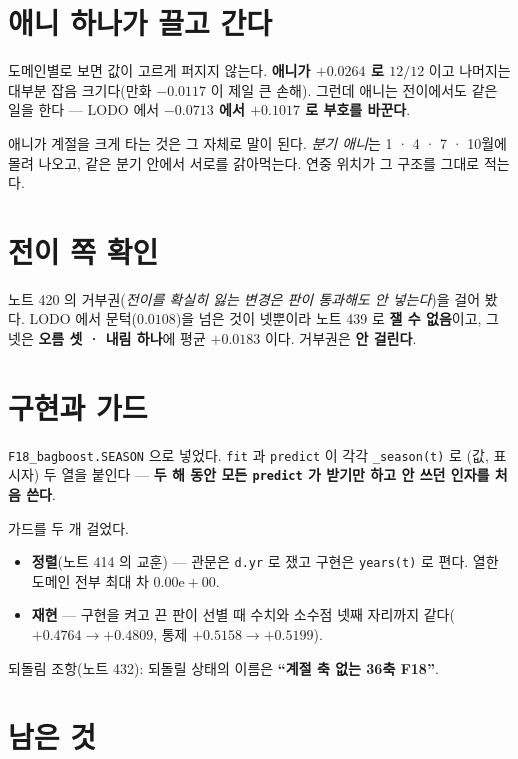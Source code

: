 \documentclass[11pt]{article}
\begin{document}
\section{애니 하나가 끌고 간다}

도메인별로 보면 값이 고르게 퍼지지 않는다. \textbf{애니가 $+0.0264$ 로
$12/12$} 이고 나머지는 대부분 잡음 크기다(만화 $-0.0117$ 이 제일 큰
손해). 그런데 애니는 전이에서도 같은 일을 한다 --- LODO 에서
\textbf{$-0.0713$ 에서 $+0.1017$ 로 부호를 바꾼다}.

애니가 계절을 크게 타는 것은 그 자체로 말이 된다. \emph{분기 애니}는
1 · 4 · 7 · 10월에 몰려 나오고, 같은 분기 안에서 서로를 갉아먹는다.
연중 위치가 그 구조를 그대로 적는다.

\section{전이 쪽 확인}

노트 420 의 거부권(\emph{전이를 확실히 잃는 변경은 판이 통과해도 안
넣는다})을 걸어 봤다. LODO 에서 문턱($0.0108$)을 넘은 것이 넷뿐이라
노트 439 로 \textbf{잴 수 없음}이고, 그 넷은 \textbf{오름 셋 · 내림
하나}에 평균 $+0.0183$ 이다. 거부권은 \textbf{안 걸린다}.

\section{구현과 가드}

\texttt{F18\_bagboost.SEASON} 으로 넣었다. \texttt{fit} 과
\texttt{predict} 이 각각 \texttt{\_season(t)} 로 (값, 표시자) 두 열을
붙인다 --- \textbf{두 해 동안 모든 \texttt{predict} 가 받기만 하고 안
쓰던 인자를 처음 쓴다}.

가드를 두 개 걸었다.

\begin{itemize}
\item \textbf{정렬}(노트 414 의 교훈) --- 관문은 \texttt{d.yr} 로 쟀고
구현은 \texttt{years(t)} 로 편다. 열한 도메인 전부 최대 차
$0.00\mathrm{e}{+}00$.
\item \textbf{재현} --- 구현을 켜고 끈 판이 선별 때 수치와 소수점 넷째
자리까지 같다($+0.4764 \to +0.4809$, 통제 $+0.5158 \to +0.5199$).
\end{itemize}

되돌림 조항(노트 432): 되돌릴 상태의 이름은 \textbf{``계절 축 없는
36축 F18''}.

\section*{남은 것}
\end{document}
